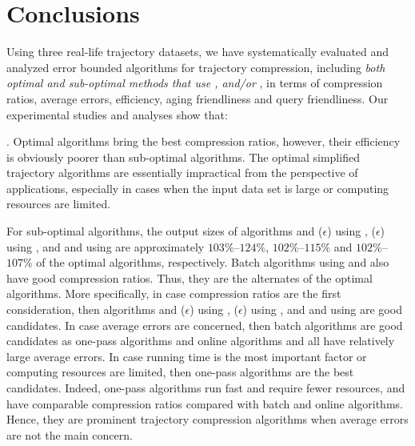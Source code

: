 \vspace{-1ex}
\section{Conclusions}

Using three real-life trajectory datasets, we have systematically evaluated and analyzed error bounded \lsa algorithms for trajectory compression, including \emph{both optimal and sub-optimal methods that use \ped, \sed and/or \dad},  in terms of compression ratios, average errors, efficiency, aging friendliness and query friendliness.
Our experimental studies and analyses show that:


. Optimal algorithms bring the best compression ratios, however, their efficiency is obviously poorer than sub-optimal algorithms. The optimal simplified trajectory algorithms are essentially impractical from the perspective of applications, especially in cases when the input data set is large or computing resources are limited.

For sub-optimal algorithms, the output sizes of algorithms \bqsa and \siped($\epsilon$) using \ped, \cised($\epsilon$) using \sed, and \tpa and \interval using \dad are approximately $103\%$--$124\%$, $102\%$--$115\%$ and $102\%$--$107\%$ of the optimal algorithms, respectively. Batch algorithms using \ped and \sed also have good compression ratios. Thus, they are the alternates of the optimal algorithms.
%
More specifically, in case compression ratios are the first consideration, then algorithms \bqsa and \siped($\epsilon$) using \ped, \cised($\epsilon$) using \sed, and \tpa and \interval using \dad are good candidates.
%
In case average errors are concerned, then batch algorithms are good candidates as one-pass algorithms and online algorithms \opwa and \bqsa all have relatively large average errors. %
%
In case running time is the most important factor or computing resources are limited, then one-pass algorithms are the best candidates.
%
Indeed, one-pass algorithms run fast and require fewer resources, and have comparable compression ratios compared with batch and online algorithms. Hence, they are prominent trajectory compression algorithms when average errors are not the main concern.

